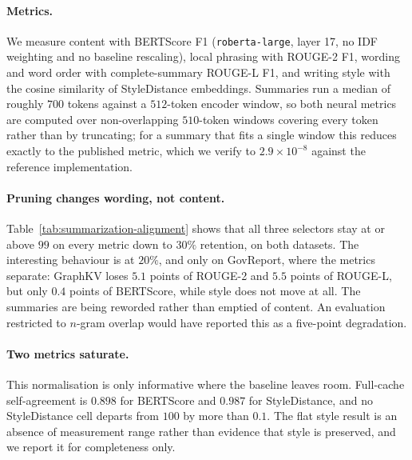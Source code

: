 \paragraph{Metrics.} We measure content with BERTScore F1 (\texttt{roberta-large}, layer 17, no IDF
weighting and no baseline rescaling), local phrasing with ROUGE-2 F1, wording and word order with
complete-summary ROUGE-L F1, and writing style with the cosine similarity of StyleDistance
embeddings. Summaries run a median of roughly $700$ tokens against a $512$-token encoder window, so
both neural metrics are computed over non-overlapping $510$-token windows covering every token
rather than by truncating; for a summary that fits a single window this reduces exactly to the
published metric, which we verify to $2.9\times10^{-8}$ against the reference implementation.

\paragraph{Pruning changes wording, not content.} Table~\ref{tab:summarization-alignment} shows that
all three selectors stay at or above $99$ on every metric down to $30\%$ retention, on both
datasets. The interesting behaviour is at $20\%$, and only on GovReport, where the metrics separate:
GraphKV loses $5.1$ points of ROUGE-2 and $5.5$ points of ROUGE-L, but only
$0.4$ points of BERTScore, while style does not move at all. The summaries are being
reworded rather than emptied of content. An evaluation restricted to $n$-gram overlap would have
reported this as a five-point degradation.

\paragraph{Two metrics saturate.} This normalisation is only informative where the baseline leaves
room. Full-cache self-agreement is $0.898$ for BERTScore and $0.987$ for StyleDistance, and no
StyleDistance cell departs from $100$ by more than $0.1$. The flat style result is an absence of
measurement range rather than evidence that style is preserved, and we report it for completeness
only.

